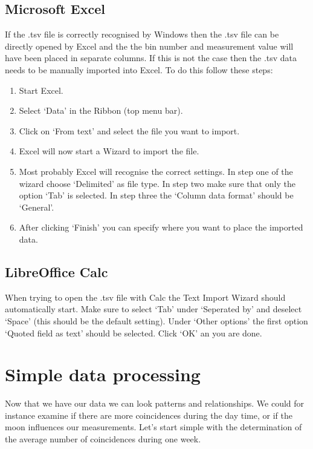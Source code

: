 \subsection{Microsoft Excel}
If the .tsv file is correctly recognised by Windows then the .tsv file can be directly opened by Excel and the the bin number and measurement value will have been placed in separate columns. If this is not the case then the .tsv data needs to be manually imported into Excel. To do this follow these steps:
\begin{enumerate}[1.]
\item Start Excel.
\item Select `Data' in the Ribbon (top menu bar).
\item Click on `From text' and select the file you want to import.
\item Excel will now start a Wizard to import the file.
\item Most probably Excel will recognise the correct settings. In step one of the wizard choose `Delimited' as file type. In step two make sure that only the option `Tab' is selected. In step three the `Column data format' should be `General'.
\item After clicking `Finish' you can specify where you want to place the imported data.
\end{enumerate}

\subsection{LibreOffice Calc}
When trying to open the .tsv file with Calc the Text Import Wizard should automatically start. Make sure to select `Tab' under `Seperated by' and deselect `Space' (this should be the default setting). Under `Other options' the first option `Quoted field as text' should be selected. Click `OK' an you are done.

\section{Simple data processing}
Now that we have our data we can look patterns and relationships. We could for instance examine if there are more coincidences during the day time, or if the moon influences our measurements. Let's start simple with the determination of the average number of coincidences during one week.

